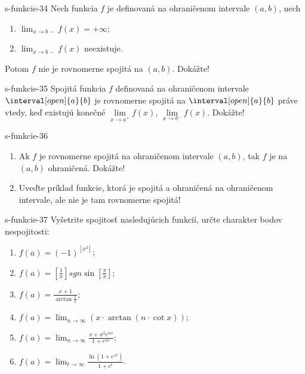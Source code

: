 \begin{defproblem}{s-funkcie-34}
  Nech funkcia $f$ je definovaná na ohraničenom intervale $(a,b)$, nech
  \begin{enumerate}
  \item $\lim_{x \rightarrow b-}f(x)=+\infty$;
  \item $\lim_{x \rightarrow b-}f(x)$ neexistuje.
  \end{enumerate}
  Potom $f$ nie je rovnomerne spojitá na $(a,b)$. Dokážte!
\end{defproblem}

\begin{defproblem}{s-funkcie-35}
  Spojitá funkcia $f$ definovaná na ohraničenom intervale
  $\interval[open]{a}{b}$ je rovnomerne spojitá na $\interval[open]{a}{b}$
  práve vtedy, keď existujú konečné
  $\lim\limits_{x \rightarrow a^+}f(x)$, $\lim\limits_{x \rightarrow b^-}f(x)$. Dokážte!
\end{defproblem}

\begin{defproblem}{s-funkcie-36}
\begin{enumerate}
\item Ak $f$ je rovnomerne spojitá na ohraničenom intervale $(a,b)$, tak $f$ je na $(a,b)$ ohraničená. Dokážte!
  \item Uveďte príklad funkcie, ktorá je spojitá a ohraničená na ohraničenom intervale, ale nie je tam rovnomerne spojitá!
\end{enumerate}
\end{defproblem}

\begin{defproblem}{s-funkcie-37}
Vyšetrite spojitosť nasledujúcich funkcií, určte charakter bodov nespojitosti:
\begin{enumerate}
\item $f(a)=(-1)^{[x^2]}$;
\item $f(a)=[\frac{1}{x}] sgn \sin [\frac{\pi}{x}]$;
\item $f(a)=\frac{x+1}{\arctan\frac{1}{x}}$;
\item $f(a)=\lim_{n \rightarrow \infty} (x \cdot \arctan(n \cdot \cot x))$;
\item $f(a)=\lim_{n \rightarrow \infty} \frac{x+x^2e^{nx}}{1+e^{nx}}$;
\item $f(a)=\lim_{t \rightarrow \infty}\frac{\ln (1+e^{xt})}{1+e^t}$.
\end{enumerate}
\end{defproblem}

